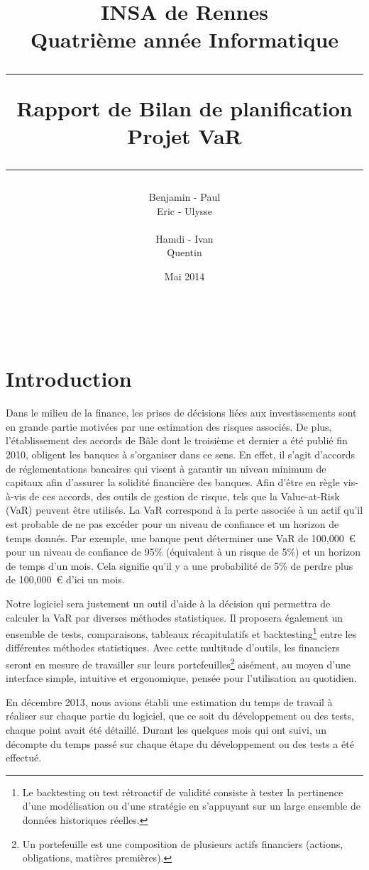 \documentclass[a4paper]{report}
\title{INSA de Rennes \\ Quatrième année Informatique \\ \bigskip \hrule \bigskip Rapport de Bilan de planification \\ \bigskip Projet VaR \bigskip \hrule}
\author{Benjamin \bsc{Bouguet} - Paul \bsc{Chaignon} \\Eric \bsc{Chauty} - Ulysse \bsc{Goarant} \\ ~~\\
Hamdi \bsc{Raissi} - Ivan \bsc{Le Plumey} \\ Quentin \bsc{Giai Gianetto}}
\date{Mai 2014}
\begin{document}
\maketitle

\thispagestyle{empty}
\newpage

~~
\thispagestyle{empty}
\newpage


\tableofcontents
\newpage


\chapter{Introduction}
Dans le milieu de la finance, les prises de décisions liées aux investissements sont en grande partie motivées par une estimation des risques associés.
De plus, l'établissement des accords de Bâle dont le troisième et dernier a été publié fin 2010, obligent les banques à s'organiser dans ce sens.
En effet, il s'agit d'accords de réglementations bancaires qui visent à garantir un niveau minimum de capitaux afin d'assurer la solidité financière des banques.
Afin d'être en règle vis-à-vis de ces accords, des outils de gestion de risque, tels que la Value-at-Risk (VaR) peuvent être utilisés.
La VaR correspond à la perte associée à un actif qu'il est probable de ne pas excéder pour un niveau de confiance et un horizon de temps donnés.
Par exemple, une banque peut déterminer une VaR de 100,000~€ pour un niveau de confiance de 95\% (équivalent à un risque de 5\%) et un horizon de temps d'un mois.
Cela signifie qu'il y a une probabilité de 5\% de perdre plus de 100,000~€ d'ici un mois.

Notre logiciel sera justement un outil d'aide à la décision qui permettra de calculer la VaR  par diverses méthodes statistiques.
Il proposera également un ensemble de tests, comparaisons, tableaux récapitulatifs et backtesting\footnote{Le backtesting ou test rétroactif de validité consiste à tester la pertinence d'une modélisation ou d'une stratégie en s'appuyant sur un large ensemble de données historiques réelles.} entre les différentes méthodes statistiques.
Avec cette multitude d'outils, les financiers seront en mesure de travailler sur leurs portefeuilles\footnote{Un portefeuille est une composition de plusieurs actifs financiers (actions, obligations, matières premières).} aisément, au moyen d’une interface simple, intuitive et ergonomique, pensée pour l'utilisation au quotidien.

En décembre 2013, nous avions établi une estimation du temps de travail à réaliser sur chaque partie du logiciel, que ce soit du développement ou des tests, chaque point avait été détaillé.
Durant les quelques mois qui ont suivi, un décompte du temps passé sur chaque étape du développement ou des tests a été effectué.
\end{document}

